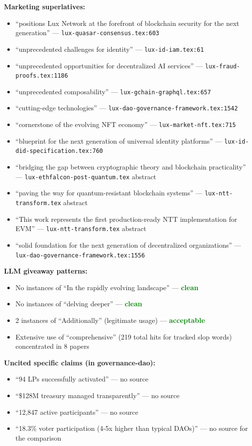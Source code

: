 \documentclass[11pt,a4paper]{article}
\newcommand{\ok}[1]{\textcolor{green}{\textbf{#1}}}
\begin{document}
\textbf{Marketing superlatives:}
\begin{itemize}[leftmargin=2em, itemsep=0pt]
\item ``positions Lux Network at the forefront of blockchain security for the next generation'' --- \texttt{lux-quasar-consensus.tex:603}
\item ``unprecedented challenges for identity'' --- \texttt{lux-id-iam.tex:61}
\item ``unprecedented opportunities for decentralized AI services'' --- \texttt{lux-fraud-proofs.tex:1186}
\item ``unprecedented composability'' --- \texttt{lux-gchain-graphql.tex:657}
\item ``cutting-edge technologies'' --- \texttt{lux-dao-governance-framework.tex:1542}
\item ``cornerstone of the evolving NFT economy'' --- \texttt{lux-market-nft.tex:715}
\item ``blueprint for the next generation of universal identity platforms'' --- \texttt{lux-id-did-specification.tex:760}
\item ``bridging the gap between cryptographic theory and blockchain practicality'' --- \texttt{lux-ethfalcon-post-quantum.tex} abstract
\item ``paving the way for quantum-resistant blockchain systems'' --- \texttt{lux-ntt-transform.tex} abstract
\item ``This work represents the first production-ready NTT implementation for EVM'' --- \texttt{lux-ntt-transform.tex} abstract
\item ``solid foundation for the next generation of decentralized organizations'' --- \texttt{lux-dao-governance-framework.tex:1556}
\end{itemize}

\textbf{LLM giveaway patterns:}
\begin{itemize}[leftmargin=2em, itemsep=0pt]
\item No instances of ``In the rapidly evolving landscape'' --- \ok{clean}
\item No instances of ``delving deeper'' --- \ok{clean}
\item 2 instances of ``Additionally'' (legitimate usage) --- \ok{acceptable}
\item Extensive use of ``comprehensive'' (219 total hits for tracked slop words) concentrated in 8 papers
\end{itemize}

\textbf{Uncited specific claims (in governance-dao):}
\begin{itemize}[leftmargin=2em, itemsep=0pt]
\item ``94 LPs successfully activated'' --- no source
\item ``\$128M treasury managed transparently'' --- no source
\item ``12,847 active participants'' --- no source
\item ``18.3\% voter participation (4-5x higher than typical DAOs)'' --- no source for the comparison
\end{itemize}
\end{document}
